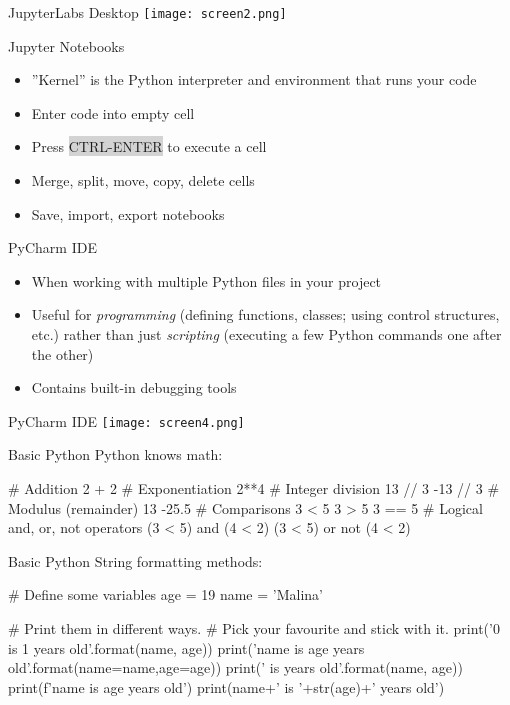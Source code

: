 \documentclass[ignorenonframetext,xcolor=x11names]{beamer}
\begin{document}
\begin{frame}{JupyterLabs Desktop}
\texttt{[image: screen2.png]}
\end{frame}

\begin{frame}{Jupyter Notebooks}
\begin{itemize}
  \item ''Kernel'' is the Python interpreter and environment that runs your code
  \item Enter code into empty cell
  \item Press \colorbox{lightgray}{CTRL-ENTER} to execute a cell
  \item Merge, split, move, copy, delete cells
  \item Save, import, export notebooks
\end{itemize}
\end{frame}

\begin{frame}{PyCharm IDE}
\begin{itemize}
   \item When working with multiple Python files in your project
   \item Useful for \emph{programming} (defining functions, classes; using control structures, etc.) rather than just \emph{scripting} (executing a few Python commands one after the other)
   \item Contains built-in debugging tools
\end{itemize}
\end{frame}

\begin{frame}{PyCharm IDE}
\centering
\texttt{[image: screen4.png]}
\end{frame}

\begin{frame}[fragile]{Basic Python}
Python knows math:
\footnotesize
\begin{pythoncode}
# Addition
2 + 2
# Exponentiation
2**4
# Integer division
13 // 3
-13 // 3
# Modulus (remainder)
13 %
-25.5 %
# Comparisons
3 < 5
3 > 5
3 == 5
# Logical and, or, not operators
(3 < 5) and (4 < 2)
(3 < 5) or not (4 < 2)
\end{pythoncode}
\end{frame}


\begin{frame}[fragile]{Basic Python}
String formatting methods:
\footnotesize
\begin{pythoncode}
# Define some variables
age = 19
name = 'Malina'

# Print them in different ways.
# Pick your favourite and stick with it.
print('{0} is {1} years old'.format(name, age))
print('{name} is {age} years old'.format(name=name,age=age))
print('{} is {} years old'.format(name, age))
print(f'{name} is {age} years old')
print(name+' is '+str(age)+' years old')
\end{pythoncode}
\end{frame}
\end{document}
